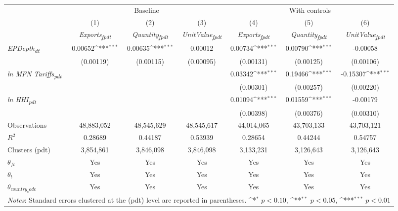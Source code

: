 {
\def\sym#1{\ifmmode^{#1}\else\(^{#1}\)\fi}
\begin{tabular}{l*{6}{c}}
\toprule
&\multicolumn{3}{c}{Baseline}&\multicolumn{3}{c}{With controls}\\\cmidrule(lr){2-4}\cmidrule(lr){5-7}
&(1)&(2)&(3)&(4)&(5)&(6)\\
&\textit{Exports\textsubscript{fpdt}}&\textit{Quantity\textsubscript{fpdt}}&\textit{UnitValue\textsubscript{fpdt}}&\textit{Exports\textsubscript{fpdt}}&\textit{Quantity\textsubscript{fpdt}}&\textit{UnitValue\textsubscript{fpdt}}\\
\midrule
\textit{EPDepth\textsubscript{dt}} & 0.00652\sym{***} & 0.00635\sym{***} & 0.00012 & 0.00734\sym{***} & 0.00790\sym{***} & -0.00058\\
 & (0.00119) & (0.00115) & (0.00095) & (0.00131) & (0.00125) & (0.00106)\\
\addlinespace
\textit{ln MFN Tariffs\textsubscript{pdt}} &  &  &  & 0.03342\sym{***} & 0.19466\sym{***} & -0.15307\sym{***}\\
 &  &  &  & (0.00301) & (0.00257) & (0.00220)\\
\addlinespace
\textit{ln HHI\textsubscript{pdt}} &  &  &  & 0.01094\sym{***} & 0.01559\sym{***} & -0.00179\\
 &  &  &  & (0.00398) & (0.00376) & (0.00310)\\
\midrule
Observations & 48,883,052 & 48,545,629 & 48,545,617 & 44,014,065 & 43,703,133 & 43,703,121\\
$R^{2}$ & 0.28689 & 0.44187 & 0.53939 & 0.28654 & 0.44244 & 0.54757\\
Clusters (pdt) & 3,854,861 & 3,846,098 & 3,846,098 & 3,133,231 & 3,126,643 & 3,126,643\\
$\theta_{ft}$ & Yes & Yes & Yes & Yes & Yes & Yes\\
$\theta_{t}$ & Yes & Yes & Yes & Yes & Yes & Yes\\
$\theta_{country_code}$ & Yes & Yes & Yes & Yes & Yes & Yes\\
\bottomrule
\multicolumn{7}{l}{\footnotesize \textit{Notes}: Standard errors clustered at the (pdt) level are reported in parentheses. \sym{*} \(p<0.10\), \sym{**} \(p<0.05\), \sym{***} \(p<0.01\)}\\
\end{tabular}
}
